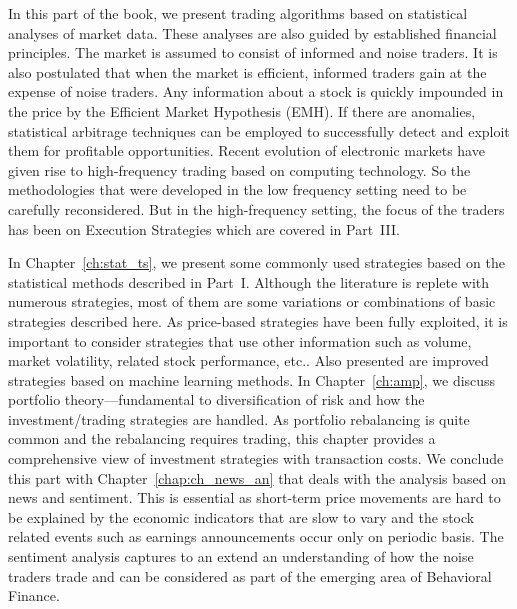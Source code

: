 
In this part of the book, we present trading algorithms based on statistical analyses of market data. These analyses are also guided by established financial principles. The market is assumed to consist of informed and noise traders. It is also postulated that when the market is efficient, informed traders gain at the expense of noise traders. Any information about a stock is quickly impounded in the price by the Efficient Market Hypothesis (EMH). If there are anomalies, statistical arbitrage techniques can be employed to successfully detect and exploit them for profitable opportunities. Recent evolution of electronic markets have given rise to high-frequency trading based on computing technology. So the methodologies that were developed in the low frequency setting need to be carefully reconsidered. But in the high-frequency setting, the focus of the traders has been on Execution Strategies which are covered in Part~III.


In Chapter~\ref{ch:stat_ts}, we present some commonly used strategies based on the statistical methods described in Part~I. Although the literature is replete with numerous strategies, most of them are some variations or combinations of basic strategies described here. As price-based strategies have been fully exploited, it is important to consider strategies that use other information such as volume, market volatility, related stock performance, etc.. Also presented are improved strategies based on machine learning methods. In Chapter~\ref{ch:amp}, we discuss portfolio theory---fundamental to diversification of risk and how the investment/trading strategies are handled. As portfolio rebalancing is quite common and the rebalancing requires trading, this chapter provides a comprehensive view of investment strategies with transaction costs. We conclude this part with Chapter~\ref{chap:ch_news_an} that deals with the analysis based on news and sentiment. This is essential as short-term price movements are hard to be explained by the economic indicators that are slow to vary and the stock related events such as earnings announcements occur only on periodic basis. The sentiment analysis captures to an extend an understanding of how the noise traders trade and can be considered as part of the emerging area of Behavioral Finance. 


